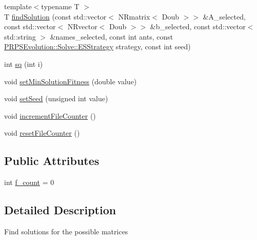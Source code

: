 \begin{DoxyCompactItemize}
\item 
{\footnotesize template$<$typename T $>$ }\\\-T \hyperlink{class_p_r_p_s_evolution_1_1_solve_1_1_process_aadf153388afd35aaf8bf39c1284bad9b}{find\-Solution} (const std\-::vector$<$ \-N\-Rmatrix$<$ \-Doub $>$$>$ \&\-A\-\_\-selected, const std\-::vector$<$ \-N\-Rvector$<$ \-Doub $>$$>$ \&b\-\_\-selected, const std\-::vector$<$ std\-::string $>$ \&names\-\_\-selected, const int ants, const \hyperlink{namespace_p_r_p_s_evolution_1_1_solve_abab6c89dae9caa790d8f2bcb1ef45685}{\-P\-R\-P\-S\-Evolution\-::\-Solve\-::\-E\-S\-Strategy} strategy, const int seed)
\item 
int \hyperlink{class_p_r_p_s_evolution_1_1_solve_1_1_process_ab18cfd7cdb1054f6a14694881305b090}{sq} (int i)
\item 
void \hyperlink{class_p_r_p_s_evolution_1_1_solve_1_1_process_a60af419059e757412da4de63d6b408fd}{set\-Min\-Solution\-Fitness} (double value)
\item 
void \hyperlink{class_p_r_p_s_evolution_1_1_solve_1_1_process_a0e1c054150e4b7c1ebdc407f57101053}{set\-Seed} (unsigned int value)
\item 
void \hyperlink{class_p_r_p_s_evolution_1_1_solve_1_1_process_a21a0e74b02bf7f5a1f18fbdf8eaef6b0}{increment\-File\-Counter} ()
\item 
void \hyperlink{class_p_r_p_s_evolution_1_1_solve_1_1_process_ae27b232f0fa44867a14f0aa32ab0c790}{reset\-File\-Counter} ()
\end{DoxyCompactItemize}
\subsection*{\-Public \-Attributes}
\begin{DoxyCompactItemize}
\item 
int \hyperlink{class_p_r_p_s_evolution_1_1_solve_1_1_process_a8827a5fb7aa8209c5c8b6d16bbffb26d}{f\-\_\-count} = 0
\end{DoxyCompactItemize}


\subsection{\-Detailed \-Description}
\-Find solutions for the possible matrices 

